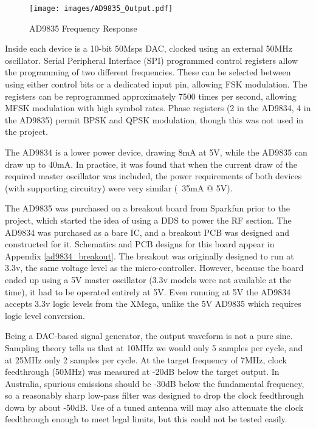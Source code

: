 \documentclass[a4paper,12pt]{article}
\begin{document}
\begin{figure}%
  \begin{center}
    \texttt{[image: images/AD9835\_Output.pdf]}
  \end{center}
  \caption{AD9835 Frequency Response}
  \label{fig:ad9835_output}
\end{figure}

Inside each device is a 10-bit 50Msps DAC, clocked using an external 50MHz oscillator. Serial Peripheral Interface (SPI) programmed control registers allow the programming of two different frequencies. These can be selected between using either control bits or a dedicated input pin, allowing FSK modulation. The registers can be reprogrammed approximately 7500 times per second, allowing MFSK modulation with high symbol rates. Phase registers (2 in the AD9834, 4 in the AD9835) permit BPSK and QPSK modulation, though this was not used in the project.

The AD9834 is a lower power device, drawing 8mA at 5V, while the AD9835 can draw up to 40mA. In practice, it was found that when the current draw of the required master oscillator was included, the power requirements of both devices (with supporting circuitry) were very similar (~35mA @ 5V).

The AD9835 was purchased on a breakout board from Sparkfun prior to the project, which started the idea of using a DDS to power the RF section. The AD9834 was purchased as a bare IC, and a breakout PCB was designed and constructed for it. Schematics and PCB designs for this board appear in Appendix \ref{ad9834_breakout}. The breakout was originally designed to run at 3.3v, the same voltage level as the micro-controller. However, because the board ended up using a 5V master oscillator (3.3v models were not available at the time), it had to be operated entirely at 5V. Even running at 5V the AD9834 accepts 3.3v logic levels from the XMega, unlike the 5V AD9835 which requires logic level conversion.

Being a DAC-based signal generator, the output waveform is not a pure sine. Sampling theory tells us that at 10MHz we would only 5 samples per cycle, and at 25MHz only 2 samples per cycle. At the target frequency of 7MHz, clock feedthrough (50MHz) was measured at -20dB below the target output. In Australia, spurious emissions should be -30dB below the fundamental frequency, so a reasonably sharp low-pass filter was designed to drop the clock feedthrough down by about -50dB. Use of a tuned antenna will may also attenuate the clock feedthrough enough to meet legal limits, but this could not be tested easily.
\end{document}
